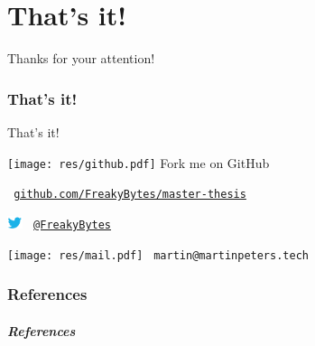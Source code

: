 \part{That's it!}
\label{part:end}

\begin{frame}[c]
	\centering
	\LARGE Thanks for your attention!
		
	\note{
	}
\end{frame}

\section*{That's it!}
\begin{frame}[c]
	{\LARGE That's it!} %
	
	\texttt{[image: res/github.pdf]}
	\hspace{6.3mm} Fork me on GitHub
	
	{\small \tt
	\textcolor{colorscheme}{\href{https://github.com/FreakyBytes/master-thesis}{github.com/FreakyBytes/master-thesis}}\\
	}
	
	\vspace{2.5em}
	
	\includegraphics[height=1em]{res/twitter.png}
	\hspace{3.5mm} \textcolor{colorscheme}{\tt\  \href{https://twitter.com/FreakyBytes}{@FreakyBytes}}
	
	\texttt{[image: res/mail.pdf]}
	\hspace{4.45mm} \textcolor{colorscheme}{\tt\  martin@martinpeters.tech}
		
\end{frame}

\section{References}
\begin{frame}[t,shrink=40]
	\frametitle{References}
	
	\printbibliography
		
	\note{
	}
\end{frame}